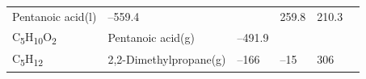 \documentclass[
  9pt,
]{extbook}
\theoremstyle{definition}
\theoremstyle{definition}
\theoremstyle{definition}
\theoremstyle{remark}
\begin{document}
\begin{longtable}[]{@{}llllll@{}}
\begin{minipage}[t]{0.17\columnwidth}
Pentanoic acid(l)\strut
\end{minipage} & \begin{minipage}[t]{0.15\columnwidth}\raggedright
--559.4\strut
\end{minipage} & \begin{minipage}[t]{0.15\columnwidth}\raggedright
\strut
\end{minipage} & \begin{minipage}[t]{0.14\columnwidth}\raggedright
259.8\strut
\end{minipage} & \begin{minipage}[t]{0.14\columnwidth}\raggedright
210.3\strut
\end{minipage}\tabularnewline
\begin{minipage}[t]{0.07\columnwidth}\raggedright
C\textsubscript{5}H\textsubscript{10}O\textsubscript{2}\strut
\end{minipage} & \begin{minipage}[t]{0.17\columnwidth}\raggedright
Pentanoic acid(g)\strut
\end{minipage} & \begin{minipage}[t]{0.15\columnwidth}\raggedright
--491.9\strut
\end{minipage} & \begin{minipage}[t]{0.15\columnwidth}\raggedright
\strut
\end{minipage} & \begin{minipage}[t]{0.14\columnwidth}\raggedright
\strut
\end{minipage} & \begin{minipage}[t]{0.14\columnwidth}\raggedright
\strut
\end{minipage}\tabularnewline
\begin{minipage}[t]{0.07\columnwidth}\raggedright
C\textsubscript{5}H\textsubscript{12}\strut
\end{minipage} & \begin{minipage}[t]{0.17\columnwidth}\raggedright
2,2-Dimethylpropane(g)\strut
\end{minipage} & \begin{minipage}[t]{0.15\columnwidth}\raggedright
--166\strut
\end{minipage} & \begin{minipage}[t]{0.15\columnwidth}\raggedright
--15\strut
\end{minipage} & \begin{minipage}[t]{0.14\columnwidth}\raggedright
306\strut
\end{minipage} & \begin{minipage}[t]{0.14\columnwidth}\raggedright

\end{minipage}
\end{longtable}
\end{document}
